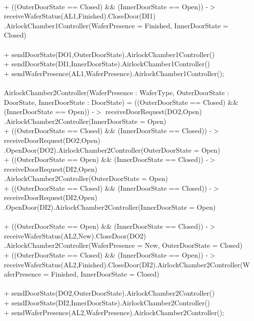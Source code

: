 \documentclass[a4paper,12pt]{article}
\begin{document}
\\+ ((OuterDoorState == Closed) \&\& (InnerDoorState == Open)) -$>$ receiveWaferStatus(AL1,Finished).CloseDoor(DI1)\\.AirlockChamber1Controller(WaferPresence = Finished, InnerDoorState = Closed)
\\
\\+ sendDoorState(DO1,OuterDoorState).AirlockChamber1Controller()
\\+ sendDoorState(DI1,InnerDoorState).AirlockChamber1Controller()
\\+ sendWaferPresence(AL1,WaferPresence).AirlockChamber1Controller();
\\
\\AirlockChamber2Controller(WaferPresence : WaferType, OuterDoorState : DoorState, InnerDoorState : DoorState) =
((OuterDoorState == Closed) \&\& (InnerDoorState == Open)) -$>$ receiveDoorRequest(DO2,Open)
\\.AirlockChamber2Controller(InnerDoorState = Open)
\\+ ((OuterDoorState == Closed) \&\& (InnerDoorState == Closed)) -$>$ receiveDoorRequest(DO2,Open)
\\.OpenDoor(DO2).AirlockChamber2Controller(OuterDoorState = Open)
\\+ ((OuterDoorState == Open) \&\& (InnerDoorState == Closed)) -$>$ receiveDoorRequest(DI2,Open)
\\.AirlockChamber2Controller(OuterDoorState = Open)
\\+ ((OuterDoorState == Closed) \&\& (InnerDoorState == Closed)) -$>$ receiveDoorRequest(DI2,Open)
\\.OpenDoor(DI2).AirlockChamber2Controller(InnerDoorState = Open)
\\
\\+ ((OuterDoorState == Open) \&\& (InnerDoorState == Closed)) -$>$ receiveWaferStatus(AL2,New).CloseDoor(DO2)
\\.AirlockChamber2Controller(WaferPresence = New, OuterDoorState = Closed)
\\+ ((OuterDoorState == Closed) \&\& (InnerDoorState == Open)) -$>$ receiveWaferStatus(AL2,Finished).CloseDoor(DI2).AirlockChamber2Controller(WaferPresence = Finished, InnerDoorState = Closed)
\\
\\+ sendDoorState(DO2,OuterDoorState).AirlockChamber2Controller()
\\+ sendDoorState(DI2,InnerDoorState).AirlockChamber2Controller()
\\+ sendWaferPresence(AL2,WaferPresence).AirlockChamber2Controller();
\end{document}
